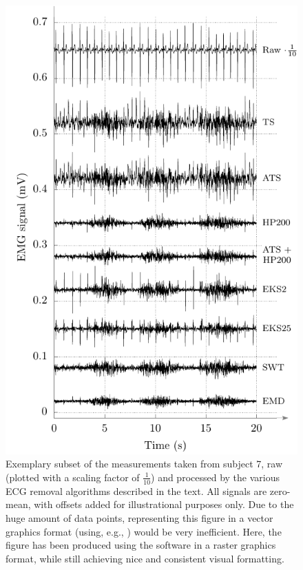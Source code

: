 \begin{figure}[htbp]
	\centering
	\includegraphics{figures/generated/emg-signals}
	\caption[This is the short caption for the EMG figure that appears in the list of figures]{Exemplary subset of the measurements taken from subject 7, raw (plotted with a scaling factor of $\frac{1}{10}$) and processed by the various ECG removal algorithms described in the text. All signals are zero-mean, with offsets added for illustrational purposes only.
	Due to the huge amount of data points, representing this figure in a vector graphics format (using, e.g., \pgfplots) would be very inefficient. 
	Here, the figure has been produced using the \gnuplot{} software in a raster graphics format, while still achieving nice and consistent visual formatting.}
	\label{fig:gnuplot-emg}
\end{figure}

